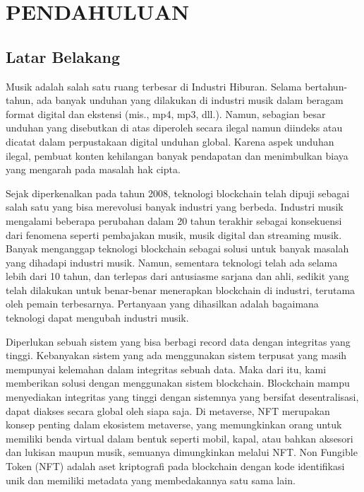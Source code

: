 \section{PENDAHULUAN}

\subsection{Latar Belakang}

Musik adalah salah satu ruang terbesar di Industri Hiburan. Selama bertahun-tahun, ada banyak unduhan yang dilakukan di industri musik dalam beragam format digital
dan ekstensi (mis., mp4, mp3, dll.). Namun, sebagian besar unduhan yang disebutkan di atas diperoleh secara ilegal namun diindeks
atau dicatat dalam perpustakaan digital unduhan global. Karena aspek unduhan ilegal, pembuat konten kehilangan banyak pendapatan
dan menimbulkan biaya yang mengarah pada masalah hak cipta.

Sejak diperkenalkan pada tahun 2008, teknologi blockchain telah dipuji sebagai salah satu yang bisa
merevolusi banyak industri yang berbeda. Industri musik mengalami beberapa perubahan dalam 20 tahun terakhir sebagai konsekuensi dari fenomena seperti pembajakan musik, musik digital dan streaming musik. Banyak
menganggap teknologi blockchain sebagai solusi untuk banyak masalah yang dihadapi industri musik.
Namun, sementara teknologi telah ada selama lebih dari 10 tahun, dan terlepas dari antusiasme
sarjana dan ahli, sedikit yang telah dilakukan untuk benar-benar menerapkan blockchain di industri,
terutama oleh pemain terbesarnya. Pertanyaan yang dihasilkan adalah bagaimana teknologi dapat mengubah
industri musik.

Diperlukan sebuah sistem yang bisa berbagi record data dengan integritas yang tinggi. Kebanyakan sistem yang ada
menggunakan sistem terpusat yang masih mempunyai kelemahan
dalam integritas sebuah data. Maka dari itu, kami memberikan
solusi dengan menggunakan sistem blockchain. Blockchain mampu
menyediakan integritas yang tinggi dengan sistemnya yang bersifat
desentralisasi, dapat diakses secara global oleh siapa saja. 
Di metaverse, NFT merupakan konsep penting dalam ekosistem metaverse, 
yang memungkinkan orang untuk memiliki benda virtual dalam bentuk seperti mobil, kapal, atau bahkan aksesori dan lukisan maupun musik, semuanya dimungkinkan melalui NFT. 
Non Fungible Token (NFT) adalah aset kriptografi pada blockchain dengan kode identifikasi unik dan memiliki metadata yang membedakannya satu sama lain.


